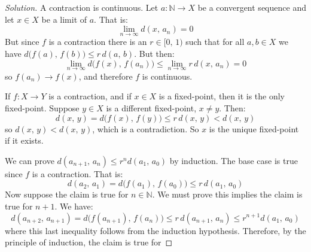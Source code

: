 \documentclass{article}
\theoremstyle{normal}
\begin{document}
    \color{black}
    \begin{proof}[Solution]
        A contraction is continuous. Let $a:\mathbb{N}\rightarrow{X}$ be a
        convergent sequence and let $x\in{X}$ be a limit of $a$. That is:
        \begin{equation}
            \lim_{n\rightarrow\infty}d(x,\,a_{n})=0
        \end{equation}
        But since $f$ is a contraction there is an $r\in[0,\,1)$ such that for
        all $a,b\in{X}$ we have $d\big(f(a),\,f(b)\big)\leq{r}\,d(a,\,b)$.
        But then:
        \begin{equation}
            \lim_{n\rightarrow\infty}d\big(f(x),\,f(a_{n})\big)
            \leq\lim_{n\rightarrow\infty}r\,d(x,\,a_{n})
            =0
        \end{equation}
        so $f(a_{n})\rightarrow{f}(x)$, and therefore $f$ is continuous.
        \par\hfill\par
        If $f:X\rightarrow{Y}$ is a contraction, and if $x\in{X}$ is a
        fixed-point, then it is the only fixed-point. Suppose
        $y\in{X}$ is a different fixed-point, $x\ne{y}$. Then:
        \begin{equation}
            d(x,\,y)
            =d\big(f(x),\,f(y)\big)
            \leq{r}\,d(x,\,y)
            <d(x,\,y)
        \end{equation}
        so $d(x,\,y)<d(x,\,y)$, which is a contradiction. So $x$ is the
        unique fixed-point if it exists.
        \par\hfill\par
        We can prove $d(a_{n+1},\,a_{n})\leq{r}^{n}d(a_{1},\,a_{0})$ by
        induction. The base case is true since $f$ is a contraction. That is:
        \begin{equation}
            d(a_{2},\,a_{1})
            =d\big(f(a_{1}),\,f(a_{0})\big)
            \leq{r}\,d(a_{1},\,a_{0})
        \end{equation}
        Now suppose the claim is true for $n\in\mathbb{N}$. We must prove this
        implies the claim is true for $n+1$. We have:
        \begin{equation}
            d(a_{n+2},\,a_{n+1})
            =d\big(f(a_{n+1}),\,f(a_{n})\big)
            \leq{r}\,d(a_{n+1},\,a_{n})
            \leq{r}^{n+1}d(a_{1},\,a_{0})
        \end{equation}
        where this last inequality follows from the induction hypothesis.
        Therefore, by the principle of induction, the claim is true for

\end{proof}
\end{document}
